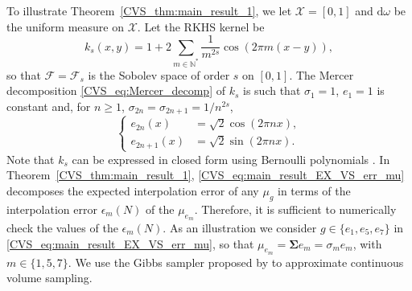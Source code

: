 \documentclass[twoside,11pt]{book}
\numberwithin{theorem}{chapter}
\numberwithin{definition}{chapter}
\numberwithin{proposition}{chapter}
\numberwithin{corollary}{chapter}
\numberwithin{example}{chapter}
\numberwithin{lemma}{chapter}
\numberwithin{assumption}{chapter}
\numberwithin{equation}{chapter}
\numberwithin{figure}{chapter}
\begin{document}
\label{CVS_sec:experiment}
To illustrate Theorem~\ref{CVS_thm:main_result_1}, we let $\mathcal{X} = [0,1]$ and $\mathrm{d}\omega$ be the uniform measure on $\mathcal{X}$. Let the RKHS kernel be \parencite{BeTh11}
\begin{equation}\label{CVS_eq:bernoulli_kernel}
k_{s}(x,y) = 1+ 2\sum\limits_{m \in \mathbb{N}^{*}} \frac{1}{m^{2s}} \cos(2\pi m(x-y)),
\end{equation}
so that $\mathcal{F}=\mathcal{F}_{s}$ is the Sobolev space of order $s$ on $[0,1]$. The Mercer decomposition \eqref{CVS_eq:Mercer_decomp} of $k_{s}$ is such that
$\sigma_{1} = 1$, $e_{1}=1$ is constant and, for $n \geq 1$, $\sigma_{2n} = \sigma_{2n+1} = 1/n^{2s}$,
\begin{equation}
\left\{
    \begin{array}{ll}
        e_{2n}(x)  & = \sqrt{2} \cos (2\pi n x),\\
        e_{2n+1}(x)  & = \sqrt{2} \sin (2\pi n x).
    \end{array}
\right.
\end{equation}
 Note that $k_{s}$ can be expressed in closed form using Bernoulli polynomials \parencite{Wah90}. In Theorem~\ref{CVS_thm:main_result_1}, \eqref{CVS_eq:main_result_EX_VS_err_mu} decomposes the expected interpolation error of any $\mu_{g}$ in terms of the interpolation error $\epsilon_{m}(N)$ of the $\mu_{e_{m}}$.
 Therefore, it is sufficient to numerically check the values of the $\epsilon_{m}(N)$. As an illustration we consider $g \in \{e_{1}, e_{5}, e_{7}\}$ in \eqref{CVS_eq:main_result_EX_VS_err_mu}, so that $\mu_{e_m} = \bm{\Sigma}e_m = \sigma_{m} e_{m}$, with $m \in \{1,5,7\}$.
 We use the Gibbs sampler proposed by \parencite{ReGh19} to approximate continuous volume sampling.


\end{document}
